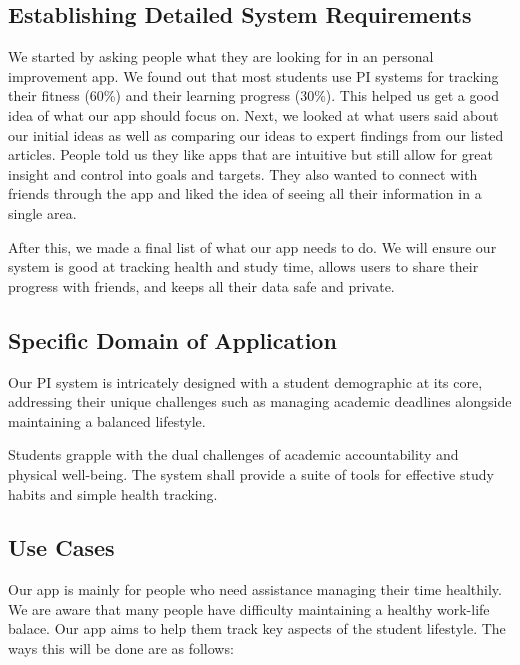 \documentclass[12pt]{article}
\begin{document}
\subsection{Establishing Detailed System Requirements}

We started by asking people what they are looking for in an personal
improvement app. We found out that most students use PI systems for
tracking their fitness (60\%) and their learning progress (30\%). This
helped us get a good idea of what our app should focus on. Next, we looked
at what users said about our initial ideas as well as comparing our ideas
to expert findings from our listed articles. People told us they like apps
that are intuitive but still allow for great insight and control into goals
and targets. They also wanted to connect with friends through the app and
liked the idea of seeing all their information in a single area.\par

After this, we made a final list of what our app needs to do. We will
ensure our system is good at tracking health and study time, allows users
to share their progress with friends, and keeps all their data safe and
private.
 
\subsection{Specific Domain of Application}

Our PI system is intricately designed with a student demographic at its core,
addressing their unique challenges such as managing academic deadlines
alongside maintaining a balanced lifestyle.\par 

Students grapple with the dual challenges of academic accountability and
physical well-being. The system shall provide a suite of tools for effective
study habits and simple health tracking.
 
\subsection{Use Cases}

Our app is mainly for people who need assistance managing their time healthily.
We are aware that many people have difficulty maintaining a healthy work-life
balace. Our app aims to help them track key aspects of the student lifestyle.
The ways this will be done are as follows: 
\end{document}

